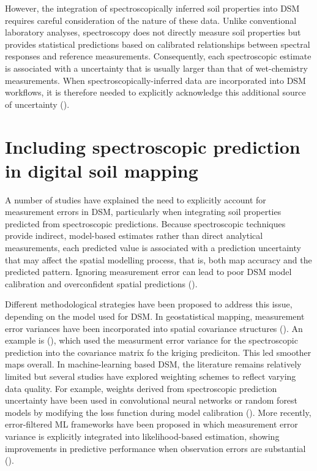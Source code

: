 \documentclass[
  10pt,
  b5paper,
  oneside]{book}
\begin{document}
However, the integration of spectroscopically inferred soil properties into DSM requires careful consideration of the nature of these data. Unlike conventional laboratory analyses, spectroscopy does not directly measure soil properties but provides statistical predictions based on calibrated relationships between spectral responses and reference measurements. Consequently, each spectroscopic estimate is associated with a uncertainty that is usually larger than that of wet-chemistry measurements. When spectroscopically-inferred data are incorporated into DSM workflows, it is therefore needed to explicitly acknowledge this additional source of uncertainty ().

\section{Including spectroscopic prediction in digital soil mapping}\label{including-spectroscopic-prediction-in-digital-soil-mapping}

A number of studies have explained the need to explicitly account for measurement errors in DSM, particularly when integrating soil properties predicted from spectroscopic predictions. Because spectroscopic techniques provide indirect, model-based estimates rather than direct analytical measurements, each predicted value is associated with a prediction uncertainty that may affect the spatial modelling process, that is, both map accuracy and the predicted pattern. Ignoring measurement error can lead to poor DSM model calibration and overconfident spatial predictions ().

Different methodological strategies have been proposed to address this issue, depending on the model used for DSM. In geostatistical mapping, measurement error variances have been incorporated into spatial covariance structures (). An example is (), which used the measurment error variance for the spectroscopic prediction into the covariance matrix fo the kriging prediciton. This led smoother maps overall. In machine-learning based DSM, the literature remains relatively limited but several studies have explored weighting schemes to reflect varying data quality. For example, weights derived from spectroscopic prediction uncertainty have been used in convolutional neural networks or random forest models by modifying the loss function during model calibration (). More recently, error-filtered ML frameworks have been proposed in which measurement error variance is explicitly integrated into likelihood-based estimation, showing improvements in predictive performance when observation errors are substantial ().
\end{document}

